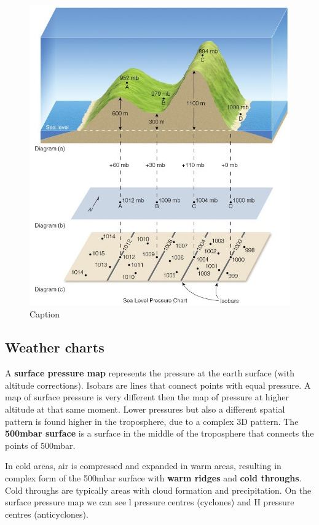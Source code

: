 \documentclass[12pt,oneside]{book}
\begin{document}
\begin{figure}

{\centering \includegraphics[width=0.8\linewidth]{figures/Figure44} 

}

\caption{Caption}\label{fig:Altcorrec}
\end{figure}

\subsection{Weather charts}\label{weather-charts}

A \textbf{surface pressure map} represents the pressure at the earth
surface (with altitude corrections). Isobars are lines that connect
points with equal pressure. A map of surface pressure is very different
then the map of pressure at higher altitude at that same moment. Lower
pressures but also a different spatial pattern is found higher in the
troposphere, due to a complex 3D pattern. The \textbf{500mbar surface}
is a surface in the middle of the troposphere that connects the points
of 500mbar.

In cold areas, air is compressed and expanded in warm areas, resulting
in complex form of the 500mbar surface with \textbf{warm ridges} and
\textbf{cold throughs}. Cold throughs are typically areas with cloud
formation and precipitation. On the surface pressure map we can see l
pressure centres (cyclones) and H pressure centres (anticyclones).
\end{document}
